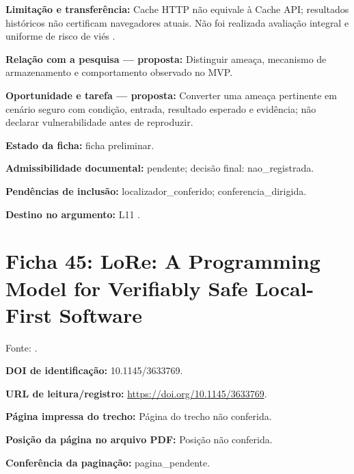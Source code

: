 \noindent\textbf{Limitação e transferência:} Cache HTTP não equivale à Cache API; resultados históricos não certificam navegadores atuais. Não foi realizada avaliação integral e uniforme de risco de viés \citep{OS06}.\par\medskip

\noindent\textbf{Relação com a pesquisa — proposta:} Distinguir ameaça, mecanismo de armazenamento e comportamento observado no MVP.\par\medskip

\noindent\textbf{Oportunidade e tarefa — proposta:} Converter uma ameaça pertinente em cenário seguro com condição, entrada, resultado esperado e evidência; não declarar vulnerabilidade antes de reproduzir.\par\medskip

\noindent\textbf{Estado da ficha:} ficha preliminar.\par\medskip

\noindent\textbf{Admissibilidade documental:} pendente; decisão final: nao\_registrada.\par\medskip

\noindent\textbf{Pendências de inclusão:} localizador\_conferido; conferencia\_dirigida.\par\medskip

\noindent\textbf{Destino no argumento:} L11 .

\clearpage\section*{Ficha 45: LoRe: A Programming Model for Verifiably Safe Local-First Software}

Fonte: \citet{OS07}.

\noindent\textbf{DOI de identificação:} 10.1145/3633769.\par\medskip

\noindent\textbf{URL de leitura/registro:} \url{https://doi.org/10.1145/3633769}.\par\medskip

\noindent\textbf{Página impressa do trecho:} Página do trecho não conferida.\par\medskip

\noindent\textbf{Posição da página no arquivo PDF:} Posição não conferida.\par\medskip

\noindent\textbf{Conferência da paginação:} pagina\_pendente.\par\medskip

